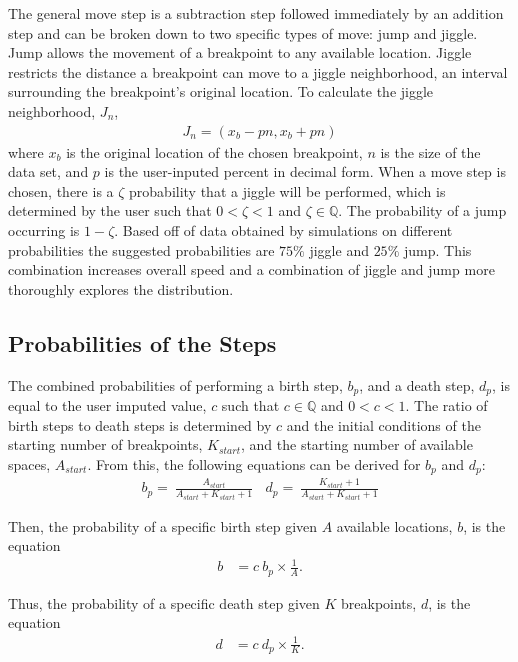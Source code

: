 \documentclass[submit]{smj}
\begin{document}
The general move step is a subtraction step followed immediately by an addition step and can be broken down to two specific types of move: jump and jiggle. Jump allows the movement of a breakpoint to any available location. Jiggle restricts the distance a breakpoint can move to a jiggle neighborhood, an interval surrounding the breakpoint's original location. To calculate the jiggle neighborhood, $J_n$, 
\begin{align*}
J_n = ( x_b-pn, x_b+pn )
\end{align*}
where $x_b$ is the original location of the chosen breakpoint, $n$ is the size of the data set, and $p$ is the user-inputed percent in decimal form. When a move step is chosen, there is a $\zeta$ probability that a jiggle will be performed, which is determined by the user such that $0<\zeta<1$ and $\zeta \in \mathbb{Q}$. The probability of a jump occurring is $1-\zeta$.  Based off of data obtained by simulations on different probabilities the suggested probabilities are $75\%$ jiggle and $25\%$ jump. This combination increases overall speed and a combination of jiggle and jump more thoroughly explores the distribution. 

\subsection{Probabilities of the Steps}
The combined probabilities of performing a birth step, $b_p$, and a death step, $d_p$, is equal to the user imputed value, $c$ such that $c \in \mathbb{Q}$ and $0 < c < 1$. The ratio of birth steps to death steps is determined by $c$ and the initial conditions of the starting number of breakpoints, $K_{start}$, and the starting number of available spaces, $A_{start}$. From this, the following equations can be derived for $b_p$ and $d_p$: 
\begin{align*}
b_p =   \ \frac{A_{start}}{A_{start}+ K_{start}+1}  \ \ \ \ d_p =  \  \frac{K_{start}+1}{A_{start}+ K_{start}+1}
\end{align*}


Then, the probability of a specific birth step given $A$ available locations, $b$, is the equation 
\begin{align*}
b &= c \ b_p \times \frac{1}{A}.
\end{align*}

Thus, the probability of a specific death step given $K$ breakpoints, $d$, is the equation
\begin{align*}
d &= c \ d_p \times \frac{1}{K}.
\end{align*}
\end{document}
